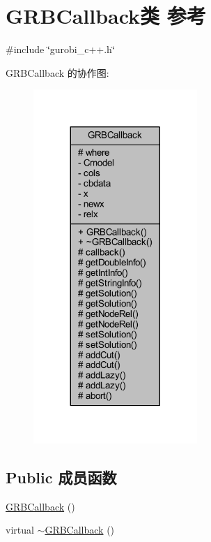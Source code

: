 \hypertarget{classGRBCallback}{}\section{G\+R\+B\+Callback类 参考}
\label{classGRBCallback}


{\ttfamily \#include \char`\"{}gurobi\+\_\+c++.\+h\char`\"{}}



G\+R\+B\+Callback 的协作图\+:
\nopagebreak
\begin{figure}[H]
\begin{center}
\leavevmode
\includegraphics[width=176pt]{classGRBCallback__coll__graph}
\end{center}
\end{figure}
\subsection*{Public 成员函数}
\begin{DoxyCompactItemize}
\item 
\hyperlink{classGRBCallback_a8c915b5ac43af4ca5a41a30a1505b7f2}{G\+R\+B\+Callback} ()
\item 
virtual \hyperlink{classGRBCallback_abf4425434716854214b1860c028a1c31}{$\sim$\+G\+R\+B\+Callback} ()
\end{DoxyCompactItemize}
